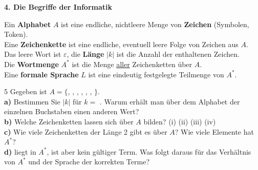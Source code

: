 \documentclass[11pt,a4paper]{article}
\begin{document}
\vspace{1mm}
\textbf{4. Die Begriffe der Informatik}

\begin{merke}\small
Ein \textbf{Alphabet} $A$ ist eine endliche, nichtleere Menge von \textbf{Zeichen} (Symbolen, Token).\\
Eine \textbf{Zeichenkette} ist eine endliche, eventuell leere Folge von Zeichen aus $A$. Das leere Wort ist $\varepsilon$, die \textbf{Länge} $|k|$ ist die Anzahl der enthaltenen Zeichen.\\
Die \textbf{Wortmenge} $A^{*}$ ist die Menge \underline{aller} Zeichenketten über $A$.\\
Eine \textbf{formale Sprache} $L$ ist eine eindeutig festgelegte Teilmenge von $A^{*}$.
\end{merke}

\begin{minipage}[t]{0.60\linewidth}\vspace{0pt}
\begin{aufgabe}{5}
Gegeben ist $A = \{$, , , , , , $\}$.\\[1mm]
\textbf{a)} Bestimmen Sie $|k|$ für $k =$ . Warum erhält man über dem Alphabet der einzelnen Buchstaben einen anderen Wert?\\
\textbf{b)} Welche Zeichenketten lassen sich über $A$ bilden?\newline
(i) \quad (ii) \quad (iii) \quad (iv) \\
\textbf{c)} Wie viele Zeichenketten der Länge 2 gibt es über $A$? Wie viele Elemente hat $A^{*}$?\\
\textbf{d)}  liegt in $A^{*}$, ist aber kein gültiger Term. Was folgt daraus für das Verhältnis von $A^{*}$ und der Sprache der korrekten Terme?
\end{aufgabe}
\end{minipage}\hfill
\begin{minipage}[t]{0.36\linewidth}\vspace{0pt}
\begin{center}
\end{center}
\end{minipage}
\end{document}
